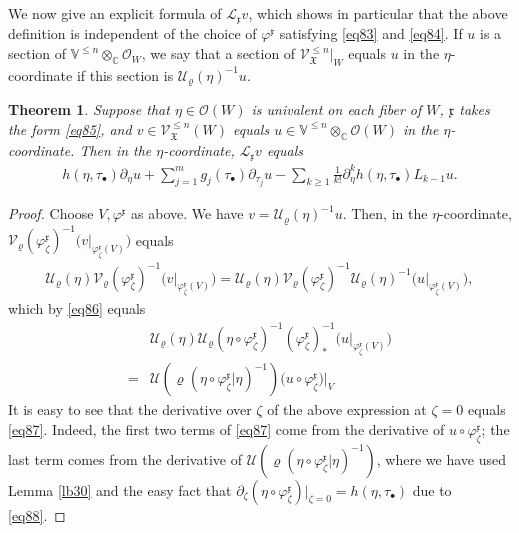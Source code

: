 \documentclass[12pt,a4paper,notitlepage]{report}
\theoremstyle{definition}
\theoremstyle{plain}
\newtheorem{thm}[df]{Theorem}
\newcommand{\fk}{\mathfrak}
\newcommand{\mc}{\mathcal}
\newcommand{\scr}{\mathscr}
\newcommand{\blt}{\bullet}
\newcommand{\Vbb}{\mathbb V}
\newcommand{\Cbb}{\mathbb C}
\numberwithin{equation}{section}
\begin{document}
We now give an explicit formula of $\mc L_{\fk x}v$, which shows in particular that the above definition is independent of the choice of $\varphi^{\fk x}$ satisfying \eqref{eq83} and \eqref{eq84}. If $u$ is a section of $\Vbb^{\leq n}\otimes_{\Cbb}\scr O_{W}$, we say that a section of $\scr V_{\fk X}^{\leq n}|_W$ equals $u$ in the $\eta$-coordinate if this section is $\mc U_\varrho(\eta)^{-1}u$. 




\begin{thm}\label{lb53}
Suppose that $\eta\in\scr O(W)$ is univalent on each fiber of $W$, $\fk x$ takes the form \eqref{eq85}, and $v\in\scr V_{\fk X}^{\leq n}(W)$ equals $u\in\Vbb^{\leq n}\otimes_{\Cbb}\scr O(W)$ in the $\eta$-coordinate. Then in the $\eta$-coordinate,  $\mc L_{\fk x}v$ equals
\begin{align}
h(\eta,\tau_\blt)\partial_\eta u+\sum_{j=1}^m g_j(\tau_\blt)\partial_{\tau_j}u-\sum_{k\geq 1}\frac 1{k!}\partial_\eta^k h(\eta,\tau_\blt)L_{k-1}u.\label{eq87}
\end{align}
\end{thm}	


\begin{proof}
Choose $V,\varphi^{\fk x}$ as above. We have $v=\mc U_\varrho(\eta)^{-1}u$. Then, in the $\eta$-coordinate, $\mc V_\varrho(\varphi^{\fk x}_\zeta)^{-1}\big(v\big|_{\varphi^{\fk x}_\zeta(V)}\big)$ equals
\begin{align*}
\mc U_\varrho(\eta)\mc V_\varrho(\varphi^{\fk x}_\zeta)^{-1}\big(v\big|_{\varphi^{\fk x}_\zeta(V)}\big)=\mc U_\varrho(\eta)\mc V_\varrho(\varphi^{\fk x}_\zeta)^{-1}\mc U_\varrho(\eta)^{-1}\big(u\big|_{\varphi^{\fk x}_\zeta(V)}\big),
\end{align*}
which by \eqref{eq86}  equals
\begin{align*}
&\mc U_\varrho(\eta)\mc U_\varrho(\eta\circ\varphi^{\fk x}_\zeta)^{-1}(\varphi^{\fk x}_\zeta)_*^{-1}\big(u\big|_{\varphi^{\fk x}_\zeta(V)}\big)\\
=&\mc U(\varrho(\eta\circ\varphi_\zeta^{\fk x}|\eta)^{-1})\big(u\circ\varphi^{\fk x}_\zeta\big)\big|_V
\end{align*}
It is easy to see that the derivative over  $\zeta$ of the above expression at $\zeta=0$ equals \eqref{eq87}. Indeed, the first two terms of \eqref{eq87} come from the derivative of $u\circ\varphi^{\fk x}_\zeta$; the last term comes from the derivative of $\mc U(\varrho(\eta\circ\varphi_\zeta^{\fk x}|\eta)^{-1})$, where we have used Lemma \ref{lb30} and the easy fact that $\partial_\zeta (\eta\circ\varphi^{\fk x}_\zeta)|_{\zeta=0}=h(\eta,\tau_\blt)$ due to \eqref{eq88}.
\end{proof}
\end{document}
